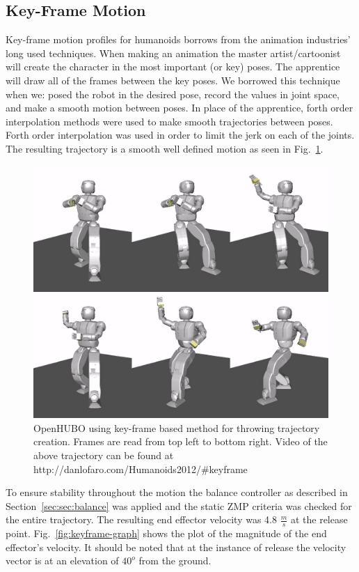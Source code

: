 \subsection{Key-Frame Motion}\label{sec:sec:keyframe}

Key-frame motion profiles for humanoids borrows from the animation industries' long used techniques.  
When making an animation the master artist/cartoonist will create the character in the most important (or key) poses.  
The apprentice will draw all of the frames between the key poses.  
We borrowed this technique when we: posed the robot in the desired pose, record the values in joint space, and make a smooth motion between poses.  
In place of the apprentice, forth order interpolation methods were used to make smooth trajectories between poses.  
Forth order interpolation was used in order to limit the jerk on each of the joints.  
The resulting trajectory is a smooth well defined motion as seen in Fig.~\ref{fig:keyframe-throw}.

\begin{figure}[t]
  \centering
\includegraphics[width=0.8\columnwidth]{./pix/keyframe/keyframe.png}
  \caption{OpenHUBO using key-frame based method for throwing trajectory creation.  Frames are read from top left to bottom right.  Video of the above trajectory can be found at http://danlofaro.com/Humanoids2012/\#keyframe}
  \label{fig:keyframe-throw}
\end{figure}

To ensure stability throughout the motion the balance controller as described in Section~\ref{sec:sec:balance} was applied and the static ZMP criteria was checked for the entire trajectory.
The resulting end effector velocity was 4.8 $\frac{m}{s}$ at the release point.  
Fig.~\ref{fig:keyframe-graph} shows the plot of the magnitude of the end effector's velocity.  
It should be noted that at the instance of release the velocity vector is at an elevation of $40^o$ from the ground.


